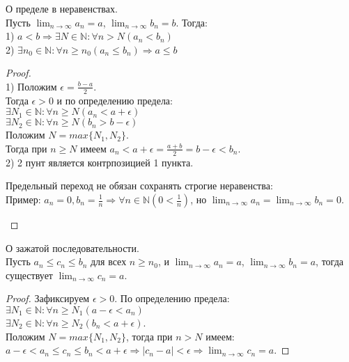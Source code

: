     \begin{theorem}
        О пределе в неравенствах.\\
        Пусть $\lim_{n \to \infty} a_{n} = a$, $\lim_{n \to \infty} b_{n} = b$. Тогда:\\
        1) $a < b \Rightarrow \exists N \in \mathds{N} : \forall n > N (a_{n} < b_{n})$\\
        2) $\exists n_0 \in \mathds{N} : \forall n \geq n_0 (a_{n} \leq b_{n}) \Rightarrow a \leq b$
    \end{theorem}

    \begin{proof} \ \\
        1) Положим $\epsilon = \frac{b-a}{2}$.\\
        Тогда $\epsilon > 0$ и по определению предела:\\
        $\exists N_1 \in \mathds{N} : \forall n \geq N (a_{n} < a+\epsilon)$\\
        $\exists N_2 \in \mathds{N} : \forall n \geq N (b_{n} > b-\epsilon)$\\
        Положим $N = max\{N_1, N_2\}$.\\
        Тогда при $n \geq N$ имеем $a_{n} < a+\epsilon = \frac{a+b}{2} = b-\epsilon  < b_{n}$.\\
        2) 2 пунт является контрпозицией 1 пункта.
        \begin{note}
            Предельный переход не обязан сохранять строгие неравенства:\\
            Пример: $a_{n} = 0, b_{n} = \frac{1}{n} \Rightarrow \forall n \in \mathds{N} (0 < \frac{1}{n})$, но $\lim_{n \to \infty} a_{n} = \lim_{n \to \infty} b_{n} = 0$.
        \end{note}
    \end{proof}

    \begin{theorem}
        О зажатой последовательности.\\
        Пусть $a_{n} \leq c_{n} \leq b_{n}$ для всех $n \geq n_0$, и $\lim_{n \to \infty} a_{n} = a$, $\lim_{n \to \infty} b_{n} = a$, тогда существует $\lim_{n \to \infty} c_{n} = a$.
    \end{theorem}

    \begin{proof}
        Зафиксируем $\epsilon > 0$. По определению предела:\\
        $\exists N_1 \in \mathds{N} : \forall n \geq N_1 (a-\epsilon < a_{n})$\\
        $\exists N_2 \in \mathds{N} : \forall n \geq N_2 (b_{n} < a+\epsilon)$.\\
        Положим $N = max\{N_1, N_2\}$, тогда при $n > N$ имеем:\\
        $a-\epsilon < a_{n} \leq c_{n} \leq b_{n} < a+\epsilon \Rightarrow |c_{n} - a| < \epsilon \Rightarrow \lim_{n \to \infty} c_{n} = a$.
    \end{proof}


